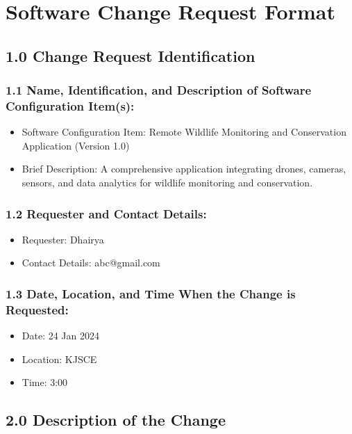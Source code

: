 \documentclass{article}
\begin{document}
\section*{Software Change Request Format}

\subsection*{1.0 Change Request Identification}

\subsubsection*{1.1 Name, Identification, and Description of Software Configuration Item(s):}
\begin{itemize}
  \item Software Configuration Item: Remote Wildlife Monitoring and Conservation Application (Version 1.0)
  \item Brief Description: A comprehensive application integrating drones, cameras, sensors, and data analytics for wildlife monitoring and conservation.
\end{itemize}

\subsubsection*{1.2 Requester and Contact Details:}
\begin{itemize}
  \item Requester: Dhairya
  \item Contact Details: abc@gmail.com
\end{itemize}

\subsubsection*{1.3 Date, Location, and Time When the Change is Requested:}
\begin{itemize}
  \item Date: 24 Jan 2024
  \item Location: KJSCE
  \item Time: 3:00
\end{itemize}

\subsection*{2.0 Description of the Change}
\end{document}
